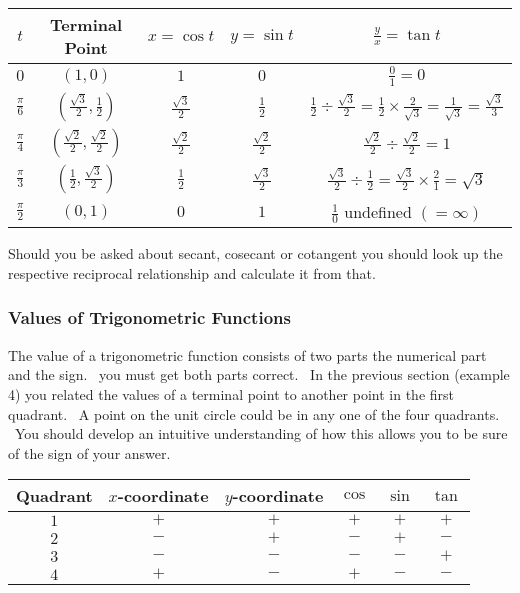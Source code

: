 \qquad \qquad
\begin{tabular}[c]{|c|c|c|c|c|}\hline
$t$  & Terminal Point  & $x =\cos  t$  & $y =\sin  t$  & $\frac{y}{x} =\tan  t$  \\
\hline
$0$  & $\left (1 ,0\right )$  & $1$  & $0$  & $\frac{0}{1} =0$  \\
\hline
$\frac{\pi }{6}$  & $\left (\frac{\sqrt{3}}{2} ,\frac{1}{2}\right )$  & $\frac{\sqrt{3}}{2}$  & $\frac{1}{2}$  & $\frac{1}{2} \div \frac{\sqrt{3}}{2} =\frac{1}{2} \times \frac{2}{\sqrt{3}} =\frac{1}{\sqrt{3}} =\frac{\sqrt{3}}{3}$  \\
\hline
$\frac{\pi }{4}$  & $\left (\frac{\sqrt{2}}{2} ,\frac{\sqrt{2}}{2}\right )$  & $\frac{\sqrt{2}}{2}$  & $\frac{\sqrt{2}}{2}$  & $\frac{\sqrt{2}}{2} \div \frac{\sqrt{2}}{2} =1$  \\
\hline
$\frac{\pi }{3}$  & $\left (\frac{1}{2} ,\frac{\sqrt{3}}{2}\right )$  & $\frac{1}{2}$  & $\frac{\sqrt{3}}{2}$  & $\frac{\sqrt{3}}{2} \div \frac{1}{2} =\frac{\sqrt{3}}{2} \times \frac{2}{1} =\sqrt{3}$  \\
\hline
$\frac{\pi }{2}$  & $\left (0 ,1\right )$  & $0$  & $1$  & $\frac{1}{0}$ undefined $\left ( =\infty \right )$  \\
\hline
\end{tabular}

Should you be asked about secant, cosecant or cotangent you should look up the respective reciprocal relationship and calculate it from that.


\subsubsection{Values of Trigonometric Functions}
The value of a trigonometric function consists of two parts the numerical part and the sign. \ you
must get both parts correct. \ In the previous section (example 4) you related the values of a terminal point
to another point in the first quadrant. \ A point on the unit circle could be in any one of the four quadrants.
\ You should develop an intuitive understanding of how this allows you to be sure of the sign of your answer.


\qquad \qquad \qquad \qquad
\begin{tabular}[c]{|c|c|c|c|c|c|}\hline
Quadrant  & $x$-coordinate  & $y$-coordinate  & $\cos $  & $\sin $  & $\tan $  \\
\hline
$1$  & $ +$  & $ +$  & $ +$  & $ +$  & $ +$  \\
\hline
$2$  & $ -$  & $ +$  & $ -$  & $ +$  & $ -$  \\
\hline
$3$  & $ -$  & $ -$  & $ -$  & $ -$  & $ +$  \\
\hline
$4$  & $ +$  & $ -$  & $ +$  & $ -$  & $ -$  \\
\hline
\end{tabular}

